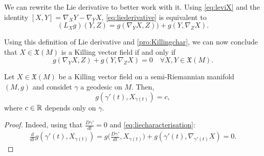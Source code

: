 We can rewrite the Lie derivative to better work with it. Using \autoref{eq:leviX} and the identity $[X,Y] = \nabla_X Y - \nabla_Y X$, \autoref{eq:liederivative} is equivalent to
\begin{equation}
	\label{liederivative2}
	(L_Xg)(Y,Z) = g(\nabla_Y X, Z)) + g(Y, \nabla_Z X).
\end{equation}

Using this definition of Lie derivative and \autoref{pro:Killingchar}, we can now conclude that $X \in \mathfrak{X}(M)$ is a Killing vector field if and only if
\begin{equation}
	\label{eq:liecharacterisation}
	g(\nabla_Y X, Z) + g(Y, \nabla_Z X) = 0 \quad \forall X,Y\in\mathfrak{X}(M).
\end{equation}

\begin{proposition}
	Let $X\in\mathfrak{X}(M)$ be a Killing vector field on a semi-Riemannian manifold $(M,g)$ and considet $\gamma$ a geodesic on $M$. Then,
	\[
		g(\gamma'(t), X_{\gamma(t)}) = c,
	\]
	where $c\in\mathbb{R}$ depends only on $\gamma$.
\end{proposition}

\begin{proof}
	Indeed, using that $\frac{D\gamma'}{dt} = 0$ and \autoref{eq:liecharacterisation}:
	\begin{align*}
		\frac{d}{dt} g\left(\gamma'(t),X_{\gamma(t)}\right) = g\biggl(\frac{D\gamma'}{dt}, X_{\gamma(t)}\biggr) + g\left(\gamma'(t), \nabla_{\gamma'(t)}X\right) = 0.
	\end{align*}
\end{proof}